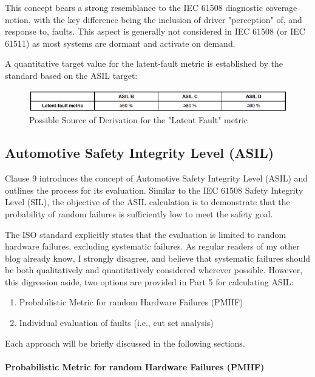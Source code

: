 \documentclass[./dissertation.tex]{subfiles}
\begin{document}
This concept bears a strong resemblance to the IEC 61508 diagnostic coverage notion, with the key difference being the inclusion of driver "perception" of, and response to, faults. This aspect is generally not considered in IEC 61508 (or IEC 61511) as most systems are dormant and activate on demand.

A quantitative target value for the latent-fault metric is established by the standard based on the ASIL target:

\begin{figure}[H]
\centering
\includegraphics[width=\linewidth]{subfiles/imgs/asil-t-5.png}
\caption{Possible Source of Derivation for the "Latent Fault" metric}
\label{fig:asil-t-5}
\end{figure}

\subsection{Automotive Safety Integrity Level (ASIL)}

Clause 9 introduces the concept of Automotive Safety Integrity Level (ASIL) and outlines the process for its evaluation. Similar to the IEC 61508 Safety Integrity Level (SIL), the objective of the ASIL calculation is to demonstrate that the probability of random failures is sufficiently low to meet the safety goal.

The ISO standard explicitly states that the evaluation is limited to random hardware failures, excluding systematic failures. As regular readers of my other blog already know, I strongly disagree, and believe that systematic failures should be both qualitatively and quantitatively considered wherever possible. However, this digression aside, two options are provided in Part 5 for calculating ASIL:

\begin{enumerate}
\item Probabilistic Metric for random Hardware Failures (PMHF)
\item Individual evaluation of faults (i.e., cut set analysis)
\end{enumerate}

Each approach will be briefly discussed in the following sections.

\paragraph{Probabilistic Metric for random Hardware Failures (PMHF)}
\end{document}

